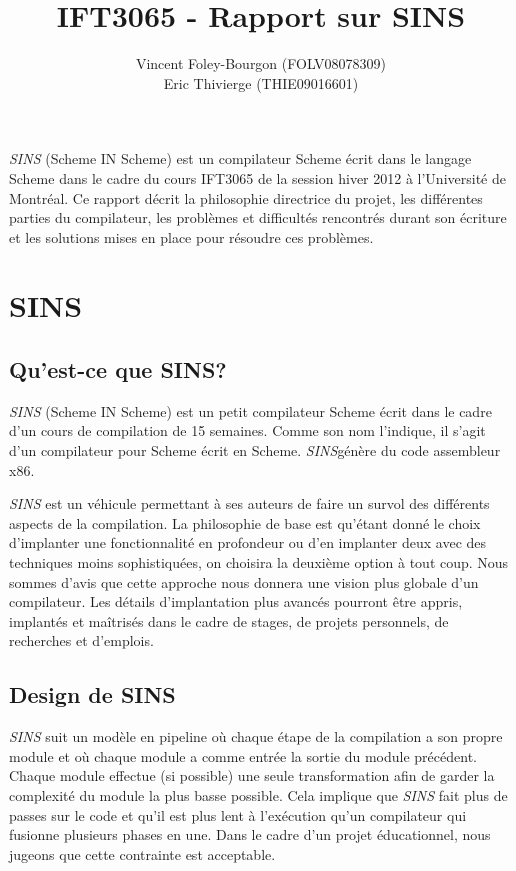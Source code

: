 \documentclass[11pt]{report}
\begin{document}
\newcommand{\sins}{\emph{SINS}}

\title{IFT3065 - Rapport sur SINS}
\author{Vincent Foley-Bourgon (FOLV08078309) \\
Eric Thivierge (THIE09016601)}
\maketitle

\abstract

\sins{} (Scheme IN Scheme) est un compilateur Scheme écrit dans le
langage Scheme dans le cadre du cours IFT3065 de la session hiver 2012
à l'Université de Montréal.  Ce rapport décrit la philosophie
directrice du projet, les différentes parties du compilateur, les
problèmes et difficultés rencontrés durant son écriture et les
solutions mises en place pour résoudre ces problèmes.

\chapter{SINS}

\section{Qu'est-ce que SINS?}

\sins{} (Scheme IN Scheme) est un petit compilateur Scheme écrit
dans le cadre d'un cours de compilation de 15 semaines.  Comme son nom
l'indique, il s'agit d'un compilateur pour Scheme écrit en Scheme.
\sins génère du code assembleur x86.

\sins{} est un véhicule permettant à ses auteurs de faire un
survol des différents aspects de la compilation.  La philosophie de
base est qu'étant donné le choix d'implanter une fonctionnalité en
profondeur ou d'en implanter deux avec des techniques moins
sophistiquées, on choisira la deuxième option à tout coup.  Nous
sommes d'avis que cette approche nous donnera une vision plus globale
d'un compilateur.  Les détails d'implantation plus avancés pourront
être appris, implantés et maîtrisés dans le cadre de stages, de
projets personnels, de recherches et d'emplois.


\section{Design de SINS}

\sins{} suit un modèle en pipeline où chaque étape de la compilation a
son propre module et où chaque module a comme entrée la sortie du
module précédent.  Chaque module effectue (si possible) une seule
transformation afin de garder la complexité du module la plus basse
possible.  Cela implique que \sins{} fait plus de passes sur le code et
qu'il est plus lent à l'exécution qu'un compilateur qui fusionne
plusieurs phases en une.  Dans le cadre d'un projet éducationnel,
nous jugeons que cette contrainte est acceptable.
\end{document}

